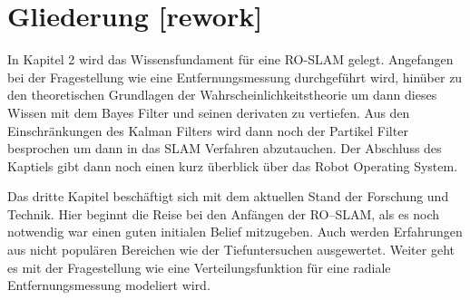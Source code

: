 \begin{comment}
------------------------------------------------------------------------------------------
- Die Vorgehensweise und die Wahl der Methode sollte begründet und dargelegt werden.
\end{comment}


\begin{comment}
------------------------------------------------------------------------------------------
- Wie ist die Bachelorarbeit aufgebaut?
- Was erwartet einen in den folgenden Kapitel/Abschnitten?
- Pro Kapitel einen Absatz.
- auf keinen Fall nur eine Wiederholung des Inhaltsverzeichnisses sein
- Wie bauen die Kapitel aufeinander auf? Dies muss erläutert und nicht nacherzählt werden.
- Überblick über den Aufbau der Bachelorarbeit: Wie bauen die einzelnen Kapitel aufeinander auf, welcher Argumentationslinie wird gefolgt; dieser sollte aber nie eine Nacherzählung der Inhaltsverzeichnisses sein!
- Schlussendlich gibst du dem Leser einen Gesamtüberblick über deine Bachelorarbeit, in dem du den Aufbau erläuterst, den roten Faden erkennen lässt und darstellst, wie die Forschungsfragen beantwortet werden.
\end{comment}
\section{Gliederung [rework]}

In Kapitel 2 wird das Wissensfundament für eine RO-SLAM gelegt. Angefangen bei der Fragestellung wie eine Entfernungsmessung durchgeführt wird, hinüber zu den theoretischen Grundlagen der Wahrscheinlichkeitstheorie um dann dieses Wissen mit dem Bayes Filter und seinen derivaten zu vertiefen. Aus den Einschränkungen des Kalman Filters wird dann noch der Partikel Filter besprochen um dann in das SLAM Verfahren abzutauchen. Der Abschluss des Kaptiels gibt dann noch einen kurz überblick über das Robot Operating System.

Das dritte Kapitel beschäftigt sich mit dem aktuellen Stand der Forschung und Technik. Hier beginnt die Reise bei den Anfängen der RO--SLAM, als es noch notwendig war einen guten initialen Belief mitzugeben. Auch werden Erfahrungen aus nicht populären Bereichen wie der Tiefuntersuchen ausgewertet. Weiter geht es  mit der Fragestellung wie eine Verteilungsfunktion für eine radiale Entfernungsmessung modeliert wird. 

